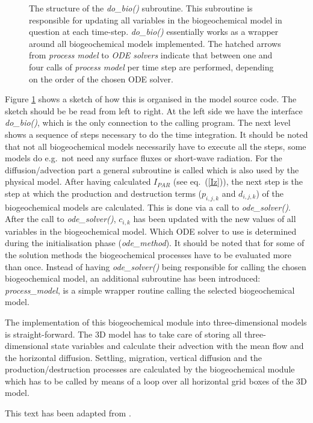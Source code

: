 \begin{figure}
\begin{center}
\caption{
The structure of the \emph{do\_bio()} subroutine. This subroutine is responsible
for updating all variables in the biogeochemical model in question at each time-step.
\emph{do\_bio()} essentially works as a wrapper around all biogeochemical models
implemented.
The hatched arrows from \emph{process model} to \emph{ODE solvers}
indicate that between one and four calls 
of  \emph{process model}
per time step are performed, depending on the order of the chosen ODE solver.  
}\label{fig_bio_code}
\end{center}
\end{figure}

Figure \ref{fig_bio_code} shows a sketch of how this is organised in the
model source code. 
The sketch should be be read from left to right. At the left side we have 
the interface \emph{do\_bio()}, which is the only connection to the
calling program. The next level shows a sequence of steps necessary to do the
time integration. It should be noted that not all biogeochemical 
models necessarily
have to execute all the steps, some models do e.g.\
not need any surface fluxes or short-wave radiation.
For the diffusion/advection part a general subroutine is called
which is also used by 
the physical model. 
After having calculated $I_{PAR}$ (see eq.\ (\ref{Iz})),
the next step is the step at which the production and destruction terms
($p_{i,j,k}$ and $d_{i,j,k}$)
of the biogeochemical models are calculated. This is done via a call to 
\emph{ode\_solver()}. After the call to \emph{ode\_solver()}, $c_{i,k}$
has been updated with the new values of all variables in the
biogeochemical model. Which ODE solver to use is determined during the 
initialisation phase (\emph{ode\_method}).
It should be noted
that for some of the solution methods the biogeochemical processes have to 
be evaluated more than once. Instead of having \emph{ode\_solver()} being 
responsible for calling the chosen biogeochemical model,
an additional subroutine
has been introduced: \emph{process\_model}, is a simple
wrapper routine calling the selected biogeochemical model.

The implementation of this biogeochemical module into three-dimensional models
is straight-forward. The 3D model has to take care of storing all
three-dimensional state variables and calculate their advection with the
mean flow and the horizontal diffusion.
Settling, migration, vertical diffusion and the production/destruction
processes are calculated by the biogeochemical module which has to be
called by means of a loop over all horizontal grid boxes of the 3D
model.



This text has been adapted from \cite{Burchardetal05}.

